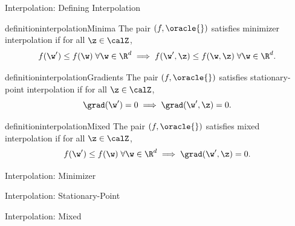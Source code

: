 \documentclass[mathserif,notheorems, hyperref={colorlinks, urlcolor=blue, linkcolor=blue}]{beamer}
\begin{document}
    \begin{frame}{Interpolation: Defining Interpolation}
        
        \begin{restatable}{definition}{interpolationMinima}\label{def:interpolation-minima}
            The pair \( (f, \oracle{}) \) satisfies minimizer interpolation if for all \( \z \in \calZ \),
            \[ f(\w') \leq f(\w) \; \forall \w \in \R^d \implies f(\w', \z) \leq f(\w, \z) \; \forall \w \in \R^d.  \]
        \end{restatable}
        \pause
        \begin{restatable}{definition}{interpolationGradients}\label{def:interpolation-gradients}
            The pair \( (f, \oracle{}) \) satisfies stationary-point interpolation if for all \( \z \in \calZ \),
            \[ \grad(\w') = 0 \implies \grad(\w', \z) = 0. \]
        \end{restatable}
        \pause
        \begin{restatable}{definition}{interpolationMixed}\label{def:interpolation-mixed}
            The pair \( (f, \oracle{}) \) satisfies mixed interpolation if for all \( \z \in \calZ \),
            \[ f(\w') \leq f(\w) \; \forall \w \in \R^d \implies \grad(\w', \z) = 0. \]
        \end{restatable}

    \end{frame}

    \begin{frame}{Interpolation: Minimizer}
        \begin{figure}
            \centering 
             
        \end{figure}
        
        \interpolationMinima*

    \end{frame}


    \begin{frame}{Interpolation: Stationary-Point}
        \begin{figure}
           \centering 
             
        \end{figure}
        
        \interpolationGradients*

    \end{frame}

    \begin{frame}{Interpolation: Mixed}
        \begin{figure}
           \centering 
             
        \end{figure}

        \interpolationMixed*

    \end{frame}
\end{document}
